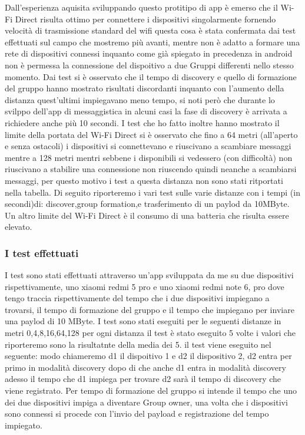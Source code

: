 Dall'esperienza aquisita sviluppando questo protitipo di app è emerso 
che il Wi-Fi Direct risulta ottimo per connettere i dispositivi singolarmente
fornendo velocità di trasmissione standard del wifi questa cosa è stata confermata
dai test effettuati sul campo che mostremo più avanti, 
mentre non è adatto a formare una rete di dispositivi connessi inquanto
come già spiegato in precedenza in android non è permessa la connessione
del dispoitivo a due Gruppi differenti nello stesso momento.
Dai test si è osservato che il tempo di discovery e quello di formazione del gruppo
hanno mostrato risultati discordanti inquanto con l'aumento della distanza quest'ultimi
impiegavano meno tempo, si noti però che durante lo svilppo dell'app di messaggistica
in alcuni casi la fase di discovery è arrivata a richiedere anche più 10 secondi.
I test che ho fatto inoltre hanno mostrato il limite della portata
del Wi-Fi Direct si è osservato che fino a 64 metri
(all'aperto e senza ostacoli) i dispositivi
si connettevano e riuscivano a scambiare messaggi  mentre a 128 metri
mentri sebbene i disponibili si vedessero (con difficoltà) non riuscivano
a stabilire una connessione non riuscendo quindi neanche a scambiarsi messaggi,
per questo motivo i test a questa distanza non sono stati ritportati nella tabella.
Di seguito riporteremo i vari test sulle varie distanze con i tempi (in secondi)di:
discover,group formation,e trasferimento di un paylod da 10MByte.
Un altro limite del Wi-Fi Direct è il consumo di una batteria che risulta
essere elevato.

\subsubsection{I test effettuati}
I test sono stati effettuati attraverso un'app sviluppata da me
su due dispositivi rispettivamente,
uno xiaomi redmi 5 pro e uno xiaomi redmi note 6, pro dove tengo
traccia rispettivamente del tempo che i due dispositivi impiegano a 
trovarsi, il tempo di formazione del gruppo e il tempo che impiegano
per inviare una paylod di 10 MByte.
I test sono stati eseguiti per le seguenti distanze in metri 0,4,8,16,64,128
per ogni distanza il test è stato eseguito 5 volte 
i valori che riporteremo sono la risultatnte della media dei 5.
il test viene eseguito nel seguente: modo chiameremo d1 il dispoitivo 1
e d2 il dispositivo 2,
d2 entra per primo in modalità discovery dopo di che anche d1 entra in modalità
discovery adesso il tempo che d1 impiega per trovare d2 sarà il tempo 
di discovery che viene registrato. Per tempo di formazione del 
gruppo si intende il tempo che uno dei due dispositivi impiga a
diventare Group owner, una volta che i dispositivi sono connessi
si procede con l'invio del payload e registrazione del tempo impiegato.

